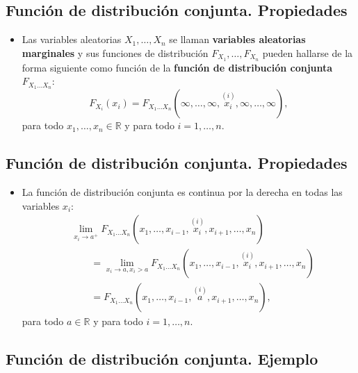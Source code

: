 \documentclass[]{book}
\providecommand{\tightlist}{%
  \setlength{\itemsep}{0pt}\setlength{\parskip}{0pt}}
\begin{document}
\hypertarget{funciuxf3n-de-distribuciuxf3n-conjunta.-propiedades-6}{%
\subsection{Función de distribución conjunta. Propiedades}\label{funciuxf3n-de-distribuciuxf3n-conjunta.-propiedades-6}}

\begin{itemize}
\tightlist
\item
  Las variables aleatorias \(X_1,\ldots, X_n\) se llaman \textbf{variables aleatorias marginales} y sus funciones de distribución \(F_{X_1},\ldots, F_{X_n}\) pueden hallarse de la forma siguiente como función de la \textbf{función de distribución conjunta} \(F_{X_1\ldots X_n}\):
  \[
  F_{X_i}(x_i)=F_{X_1\ldots X_n}(\infty,\ldots,\infty,\stackrel{(i)}{x_i},\infty,\ldots,\infty),
  \]
  para todo \(x_1,\ldots,x_n\in\mathbb{R}\) y para todo \(i=1,\ldots,n\).
\end{itemize}

\hypertarget{funciuxf3n-de-distribuciuxf3n-conjunta.-propiedades-7}{%
\subsection{Función de distribución conjunta. Propiedades}\label{funciuxf3n-de-distribuciuxf3n-conjunta.-propiedades-7}}

\begin{itemize}
\tightlist
\item
  La función de distribución conjunta es continua por la derecha en todas las variables \(x_i\):
  \[
  \begin{array}{rl}
   & \lim\limits_{x_i\to a^+}F_{X_1\ldots X_n}(x_1,\ldots,x_{i-1},\stackrel{(i)}{x_i},x_{i+1},\ldots,x_n) \\ &\qquad =\lim\limits_{x_i\to a, x_i> a}F_{X_1\ldots X_n}(x_1,\ldots,x_{i-1},\stackrel{(i)}{x_i},x_{i+1},\ldots,x_n)\\ &\qquad =F_{X_1\ldots X_n}(x_1,\ldots,x_{i-1},\stackrel{(i)}{a},x_{i+1},\ldots,x_n),
  \end{array}
  \]
  para todo \(a\in\mathbb{R}\) y para todo \(i=1,\ldots,n\).
\end{itemize}

\hypertarget{funciuxf3n-de-distribuciuxf3n-conjunta.-ejemplo-6}{%
\subsection{Función de distribución conjunta. Ejemplo}\label{funciuxf3n-de-distribuciuxf3n-conjunta.-ejemplo-6}}
\end{document}

